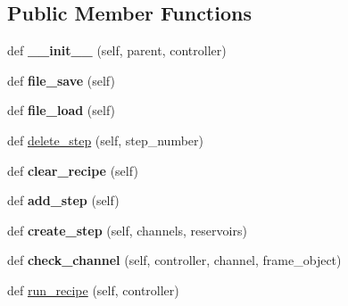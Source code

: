 \subsection*{Public Member Functions}
\begin{DoxyCompactItemize}
\item 
\mbox{\label{class_g_u_i_1_1_automatic_page_a24bc2991fd2515ec4341b3eaa8c682c6}} 
def {\bfseries \+\_\+\+\_\+init\+\_\+\+\_\+} (self, parent, controller)
\item 
\mbox{\label{class_g_u_i_1_1_automatic_page_a55efb4084de63f91f76fc7d9f8e85e4f}} 
def {\bfseries file\+\_\+save} (self)
\item 
\mbox{\label{class_g_u_i_1_1_automatic_page_aa442c41a4f0959a30bf296a4384a7a0f}} 
def {\bfseries file\+\_\+load} (self)
\item 
def \mbox{\hyperlink{class_g_u_i_1_1_automatic_page_aea693cdbd377db97bbc87460227c504e}{delete\+\_\+step}} (self, step\+\_\+number)
\item 
\mbox{\label{class_g_u_i_1_1_automatic_page_a4b92068bc9984757f343003e84229bb4}} 
def {\bfseries clear\+\_\+recipe} (self)
\item 
\mbox{\label{class_g_u_i_1_1_automatic_page_a8ebd8c7b250fbb945a7255ba42bed48d}} 
def {\bfseries add\+\_\+step} (self)
\item 
\mbox{\label{class_g_u_i_1_1_automatic_page_ac8a09650fd67fa404ee6d45a27cb11ed}} 
def {\bfseries create\+\_\+step} (self, channels, reservoirs)
\item 
\mbox{\label{class_g_u_i_1_1_automatic_page_a4281ddefe815f6e04513e8e0342974b6}} 
def {\bfseries check\+\_\+channel} (self, controller, channel, frame\+\_\+object)
\item 
def \mbox{\hyperlink{class_g_u_i_1_1_automatic_page_a583b326d8206caf80794251790de6ded}{run\+\_\+recipe}} (self, controller)
\end{DoxyCompactItemize}

